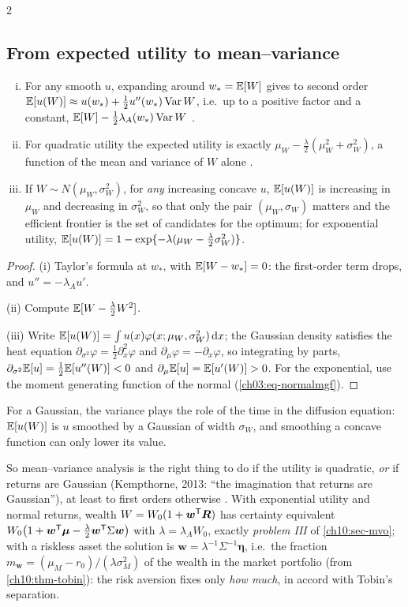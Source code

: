 \begin{paracol}{2}
\subsection{From expected utility to mean--variance}
\begin{proposition}\label{ch10:prop-mv-utility}
\leavevmode
\begin{enumerate}[(i)]
  \item For any smooth $u$, expanding around $w_*=\mathbb{E}[W]$ gives to second order
      $\mathbb{E}[u(W)]\approx u(w_*)+\tfrac12u''(w_*)\operatorname{Var} W$, i.e.\ up to a positive factor and a constant,
      $\mathbb{E}[W]-\frac12\lambda_A(w_*)\operatorname{Var} W$ .
  \item For quadratic utility the expected utility is exactly $\mu_W-\frac\lambda2(\mu_W^2+\sigma_W^2)$, a function of the mean
      and variance of $W$ alone .
  \item If $W\sim N(\mu_W,\sigma_W^2)$, for \emph{any} increasing concave $u$, $\mathbb{E}[u(W)]$ is increasing in $\mu_W$ and
      decreasing in $\sigma_W^2$, so that only the pair $(\mu_W,\sigma_W)$ matters and the efficient frontier is the set of
      candidates for the optimum; for exponential utility, $\mathbb{E}[u(W)]=1-\exp\{-\lambda(\mu_W-\frac\lambda2\sigma_W^2)\}$.
\end{enumerate}
\end{proposition}
\begin{proof}
(i) Taylor's formula at $w_*$, with $\mathbb{E}[W-w_*]=0$: the first-order term drops, and $u''=-\lambda_Au'$.

(ii) Compute
$\mathbb{E}[W-\frac\lambda2W^2]$.

(iii) Write $\mathbb{E}[u(W)]=\int u(x)\varphi(x;\mu_W,\sigma_W^2)\,\mathrm{d} x$; the Gaussian density satisfies the
heat equation $\partial_{\sigma^2}\varphi=\frac12\partial_x^2\varphi$ and $\partial_\mu\varphi=-\partial_x\varphi$, so
integrating by parts, $\partial_{\sigma^2}\mathbb{E}[u]=\frac12\mathbb{E}[u''(W)]<0$ and $\partial_\mu\mathbb{E}[u]=\mathbb{E}[u'(W)]>0$. For the exponential,
use the moment generating function of the normal (\cref{ch03:eq-normalmgf}).
\end{proof}
\begin{intuition}
For a Gaussian, the variance plays the role of the time in the diffusion equation: $\mathbb{E}[u(W)]$ is $u$ smoothed by
a Gaussian of width $\sigma_W$, and smoothing a concave function can only lower its value.
\end{intuition}
So mean--variance analysis is the right thing to do if the utility is quadratic, \emph{or} if returns are Gaussian
(Kempthorne, 2013: ``the imagination that returns are Gaussian''), at least to first orders otherwise
. With exponential utility and normal returns, wealth
$W=W_0(1+\bm w^{\mathsf T}\bm R)$ has certainty equivalent $W_0\bigl(1+\bm w^{\mathsf T}\bm\mu-\frac\lambda2\bm w^{\mathsf T}\Sigma\bm w\bigr)$ with
$\lambda=\lambda_AW_0$, exactly \emph{problem III} of \cref{ch10:sec-mvo}; with a riskless asset the solution is
$\bm w=\lambda^{-1}\Sigma^{-1}\bm\eta$, i.e.\ the fraction $m_{\bm w}=(\mu_M-r_0)/(\lambda\sigma_M^2)$ of the wealth in the
market portfolio (from \cref{ch10:thm-tobin}): the risk aversion fixes only \emph{how much}, in accord with
Tobin's separation.


\end{paracol}
